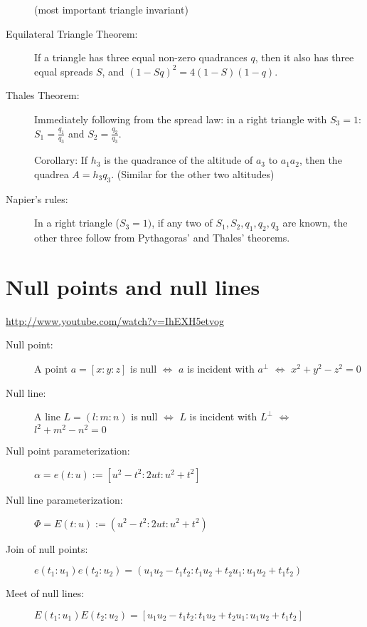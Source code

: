 \documentclass[DIV16,halfparskip]{scrartcl}
\newcommand{\C}{\!\!:\!\!}
\begin{document}
\begin{description}
        (most important triangle invariant)

    \item [Equilateral Triangle Theorem:] If a triangle has three equal
        non-zero quadrances $q$, then it also has three equal spreads $S$, and
        $(1-Sq)^2=4(1-S)(1-q)$.

    \item [Thales Theorem:] Immediately following from the spread law: in a
        right triangle with $S_3=1$:\\
        $S_1=\frac{q_1}{q_3}$ and $S_2=\frac{q_2}{q_3}$.

        Corollary: If $h_3$ is the quadrance of the altitude of $a_3$ to
        $a_1a_2$, then the quadrea $A=h_3q_3$. (Similar for the other two
        altitudes)

    \item [Napier's rules:] In a right triangle ($S_3=1)$, if any two of
        $S_1, S_2, q_1, q_2, q_3$ are known, the other three follow from
        Pythagoras' and Thales' theorems.
\end{description}

\section{Null points and null lines}
\url{http://www.youtube.com/watch?v=IhEXH5etvog}

\begin{description}
    \item [Null point:] A point $a=[x\C y\C z]$ is null $\Leftrightarrow$ $a$
        is incident with $a^\perp$ $\Leftrightarrow$ $x^2+y^2-z^2=0$
    \item [Null line:] A line $L=(l\C m\C n)$ is null $\Leftrightarrow$ $L$
        is incident with $L^\perp$ $\Leftrightarrow$ $l^2+m^2-n^2=0$
    \item [Null point parameterization:] \( \alpha = e(t\C u) := [u^2-t^2 : 2ut : u^2+t^2] \)
    \item [Null line parameterization:] \( \Phi = E(t\C u) := (u^2-t^2 : 2ut : u^2+t^2) \)
    \item [Join of null points:] \( e(t_1\C u_1)e(t_2\C u_2) = 
        (u_1u_2-t_1t_2 : t_1u_2+t_2u_1 : u_1u_2 + t_1t_2) \)
    \item [Meet of null lines:] \( E(t_1\C u_1)E(t_2\C u_2) = 
        [u_1u_2-t_1t_2 : t_1u_2+t_2u_1 : u_1u_2 + t_1t_2] \)

\end{description}
\end{document}
